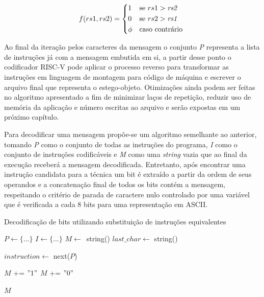 \begin{equation}
    f(rs1, rs2) =
    \begin{cases*}
      1 & se $rs1 > \mathit{rs2}$ \\
      0 & se $rs2 > \mathit{rs1}$ \\
      \phi        & caso contrário
    \end{cases*}
\end{equation}

Ao final da iteração pelos caracteres da mensagem o conjunto \textit{P} representa a lista de instruções já com a mensagem embutida em si, a partir desse ponto o codificador RISC-V pode aplicar o processo reverso para transformar as instruções em linguagem de montagem para código de máquina e escrever o arquivo final que representa o estego-objeto. Otimizações ainda podem ser feitas no algoritmo apresentado a fim de minimizar laços de repetição, reduzir uso de memória da aplicação e número escritas ao arquivo e serão expostas em um próximo capítulo.

Para decodificar uma mensagem propõe-se um algoritmo semelhante ao anterior, tomando \textit{P} como o conjunto de todas as instruções do programa, \textit{I} como o conjunto de instruções codificáveis e \textit{M} como uma \textit{string} vazia que ao final da execução receberá a mensagem decodificada. Entretanto, após encontrar uma instrução candidata para a técnica um bit é extraído a partir da ordem de seus operandos e a concatenação final de todos os bits contém a mensagem, respeitando o critério de parada de caractere nulo controlado por uma variável que é verificada a cada 8 bits para uma representação em ASCII.

\begin{algorithm}
    \caption{Decodificação de bits utilizando substituição de instruções equivalentes}\label{alg:two}
    $P \gets \{...\}$\;
    \BlankLine
    $I \gets \{...\}$\;
    \BlankLine
    $M \gets$\ string()\;
    \BlankLine
    $last\_char \gets$ string() \;
    \BlankLine
     {
        
        \BlankLine
        $instruction \gets$ next($P$)\;
        \BlankLine


        \BlankLine
            
        
        \BlankLine

         {
            $M$ += $"1"$\; 
        } {
            $M$ += $"0"$\; 
        }
    }
\BlankLine
\Return $M$\;
\end{algorithm}


